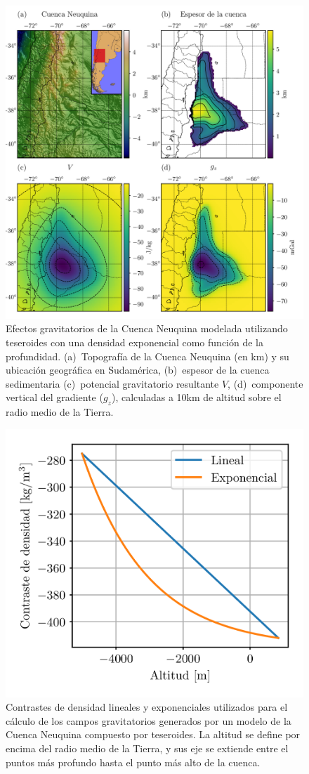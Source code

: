 \begin{figure}
\centering
\includegraphics[width=\linewidth]{figs/tesseroids-variable-density/neuquen-basin.png}
\caption{
    Efectos gravitatorios de la Cuenca Neuquina modelada utilizando teseroides
    con una densidad exponencial como función de la profundidad.
    (a)~Topografía de la Cuenca Neuquina (en km) y su ubicación geográfica en
    Sudamérica,
    (b)~espesor de la cuenca sedimentaria \citep[en metros;][]{heine2007}
    (c)~potencial gravitatorio resultante $V$,
    (d)~componente vertical del gradiente ($g_z$),
    calculadas a 10km de altitud sobre el radio medio de la Tierra.
}
\label{fig:neuquen-basin}
\end{figure}

\begin{figure}
\centering
\includegraphics[width=0.5\linewidth]{figs/tesseroids-variable-density/neuquen-basin-densities.png}
\caption{
    Contrastes de densidad lineales y exponenciales utilizados para el cálculo
    de los campos gravitatorios generados por un modelo de la Cuenca Neuquina
    compuesto por teseroides.
    La altitud se define por encima del radio medio de la Tierra, y sus eje se
    extiende entre el puntos más profundo hasta el punto más alto de la cuenca.
}
\label{fig:neuquen-basin-densities}
\end{figure}


